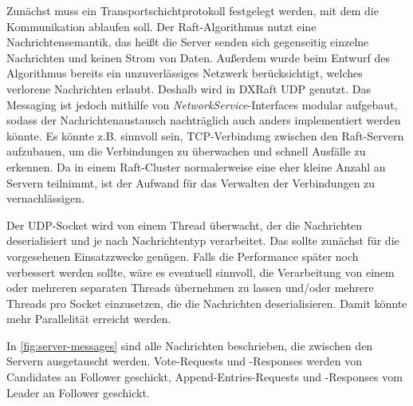 Zunächst muss ein Transportschichtprotokoll festgelegt werden, mit dem die Kommunikation ablaufen soll. 
Der Raft-Algorithmus nutzt eine Nachrichtensemantik, das heißt die Server senden sich gegenseitig einzelne Nachrichten und keinen Strom von Daten. Außerdem wurde beim Entwurf des Algorithmus bereits ein unzuverlässiges Netzwerk berücksichtigt, welches verlorene Nachrichten erlaubt. Deshalb wird in DXRaft UDP genutzt. Das Messaging ist jedoch mithilfe von \textit{NetworkService}-Interfaces modular aufgebaut, sodass der Nachrichtenaustausch nachträglich auch anders implementiert werden könnte. Es könnte z.B. sinnvoll sein, TCP-Verbindung zwischen den Raft-Servern aufzubauen, um die Verbindungen zu überwachen und schnell Ausfälle zu erkennen. Da in einem Raft-Cluster normalerweise eine eher kleine Anzahl an Servern teilnimmt, ist der Aufwand für das Verwalten der Verbindungen zu vernachlässigen.

Der UDP-Socket wird von einem Thread überwacht, der die Nachrichten deserialisiert und je nach Nachrichtentyp verarbeitet. Das sollte zunächst für die vorgesehenen Einsatzzwecke genügen. Falls die Performance später noch verbessert werden sollte, wäre es eventuell sinnvoll, die Verarbeitung von einem oder mehreren separaten Threads übernehmen zu lassen und/oder mehrere Threads pro Socket einzusetzen, die die Nachrichten deserialisieren. Damit könnte mehr Parallelität erreicht werden.

In \ref{fig:server-messages} sind alle Nachrichten beschrieben, die zwischen den Servern ausgetauscht werden. Vote-Requests und -Responses werden von Candidates an Follower geschickt, Append-Entries-Requests und -Responses vom Leader an Follower geschickt.

